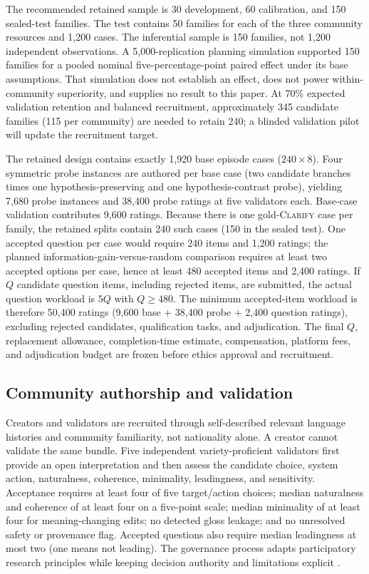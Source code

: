 \documentclass[preprint,12pt,authoryear]{elsarticle}
\newcommand{\clarify}{\ifmmode\operatorname{CLARIFY}\else\textsc{Clarify}\fi}
\begin{document}
The recommended retained sample is 30 development, 60 calibration, and 150
sealed-test families. The test contains 50 families for each of the three
community resources and 1,200 cases. The inferential sample is 150 families,
not 1,200 independent observations. A 5,000-replication planning simulation
supported 150 families for a pooled nominal five-percentage-point paired
effect under its base assumptions. That simulation does not establish an
effect, does not power within-community superiority, and supplies no result to
this paper. At 70\% expected validation retention and balanced recruitment,
approximately 345 candidate families (115 per community) are needed to retain
240; a blinded validation pilot will update the recruitment target.

The retained design contains exactly 1,920 base episode cases
($240\times8$). Four symmetric probe instances are authored per base case
(two candidate branches times one hypothesis-preserving and one
hypothesis-contrast probe), yielding 7,680 probe instances and 38,400 probe
ratings at five validators each. Base-case validation contributes 9,600
ratings. Because there is one gold-\clarify{} case per family, the retained
splits contain 240 such cases (150 in the sealed test). One accepted question
per case would require 240 items and 1,200 ratings; the planned
information-gain-versus-random comparison requires at least two accepted
options per case, hence at least 480 accepted items and 2,400 ratings. If
$Q$ candidate question items, including rejected items, are submitted, the
actual question workload is $5Q$ with $Q\ge480$. The minimum accepted-item
workload is therefore 50,400 ratings (9,600 base + 38,400 probe + 2,400
question ratings), excluding rejected candidates, qualification tasks, and
adjudication. The final $Q$, replacement allowance, completion-time estimate,
compensation, platform fees, and adjudication budget are frozen before ethics
approval and recruitment.

\subsection{Community authorship and validation}

Creators and validators are recruited through self-described relevant
language histories and community familiarity, not nationality alone. A
creator cannot validate the same bundle. Five independent variety-proficient
validators first provide an open interpretation and then assess the candidate
choice, system action, naturalness, coherence, minimality, leadingness, and
sensitivity. Acceptance requires at least four of five target/action choices;
median naturalness and coherence of at least four on a five-point scale;
median minimality of at least four for meaning-changing edits; no detected
gloss leakage; and no unresolved safety or provenance flag. Accepted questions
also require median leadingness at most two (one means not leading).
The governance process adapts participatory research principles while keeping
decision authority and limitations explicit
\citep{nekoto-etal-2020-participatory}.
\end{document}
